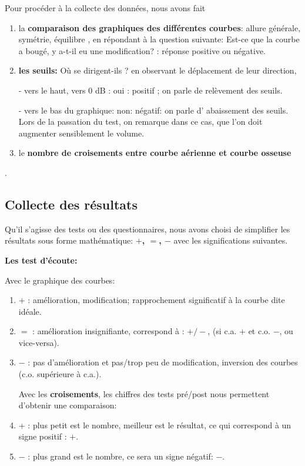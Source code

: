 Pour procéder à la collecte des données, nous avons fait 
\begin{enumerate}
		
		\item la \textbf{comparaison des graphiques des différentes courbes}: allure générale, symétrie, 
		équilibre , en répondant à la question suivante:  
		Est-ce que la courbe a bougé, y a-t-il eu une modification? : réponse  positive ou négative.
		
	\item \textbf{les seuils: }
	Où se dirigent-ils ? 
	en observant le déplacement de leur direction,
	
	-   vers le haut, vers 0 dB : oui : positif ; on parle de relèvement des seuils.
	
	
	-   vers le bas du graphique: non: négatif: on parle d' abaissement des seuils.
	Lors de la passation du test, on remarque dans ce cas, que l'on doit augmenter sensiblement le 
	volume.
	
	\item le \textbf{nombre de croisements entre courbe aérienne et courbe osseuse}
\end{enumerate}.
 \subsection*{Collecte des résultats} 
Qu'il s'agisse des tests ou des questionnaires, nous avons choisi de
simplifier les résultats sous forme 
mathématique:  \textbf{ $+$, $=$, $-$ } avec les significations suivantes.


\textbf { Les test d'écoute: } 


Avec  le graphique des courbes:
\begin{enumerate}
	\item$+$   : amélioration, modification;  rapprochement significatif à la courbe dite idéale.
	\item$=$   : amélioration insignifiante, correspond à : $+/-$, (si c.a. $ + $ et c.o. $-$, ou vice-versa).
	
	\item$-$   : pas d'amélioration et pas/trop peu  de modification, inversion
	des courbes (c.o. supérieure à c.a.).
	
	Avec les \textbf{croisements}, les chiffres des tests pré/post
	nous permettent d'obtenir une comparaison:
	\item $+$ : plus petit est le nombre, meilleur est le résultat, ce qui correspond à un signe positif : $+$.
	\item$-$   : plus grand est le nombre, ce sera un signe négatif: $-$.
\end{enumerate}

